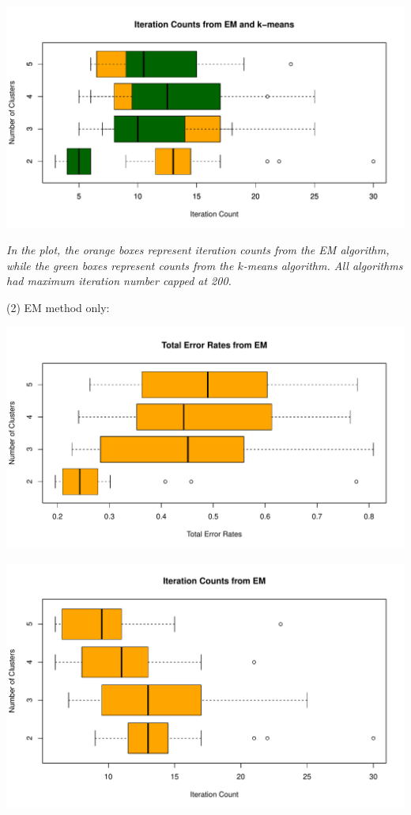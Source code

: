 \documentclass[a4paper,12pt]{article}
\begin{document}
\begin{center}
  \includegraphics[width=0.9\linewidth]{Image/Prob3-ItrCount-Ionosphere-Both.pdf}
  
   \parbox{0.9\textwidth}{\textit{In the plot, the \textcolor{myorange}{orange boxes} represent iteration counts from the EM algorithm, while the \textcolor{mydarkgreen}{green boxes} represent counts from the $k$-means algorithm. 
   All algorithms had maximum iteration number capped at 200. 
  }}
\end{center}
\bigskip

\noindent (2) EM method only:
\begin{center}
  \includegraphics[width=0.8\linewidth]{Image/Prob3-TotalErr-Ionosphere-EM.pdf}
\end{center}
\begin{center}
  \includegraphics[width=0.8\linewidth]{Image/Prob3-ItrCount-Ionosphere-EM.pdf}
\end{center}
\bigskip
\end{document}
